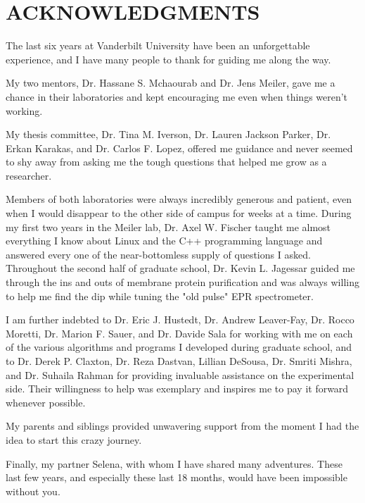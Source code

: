 
\chapter*{ACKNOWLEDGMENTS}
\vspace{7mm}

The last six years at Vanderbilt University have been an unforgettable experience, and I have many people to thank for guiding me along the way.

My two mentors, Dr. Hassane S. Mchaourab and Dr. Jens Meiler, gave me a chance in their laboratories and kept encouraging me even when things weren't working.

My thesis committee, Dr. Tina M. Iverson, Dr. Lauren Jackson Parker, Dr. Erkan Karakas, and Dr. Carlos F. Lopez, offered me guidance and never seemed to shy away from asking me the tough questions that helped me grow as a researcher.

Members of both laboratories were always incredibly generous and patient, even when I would disappear to the other side of campus for weeks at a time. During my first two years in the Meiler lab, Dr. Axel W. Fischer taught me almost everything I know about Linux and the C++ programming language and answered every one of the near-bottomless supply of questions I asked. Throughout the second half of graduate school, Dr. Kevin L. Jagessar guided me through the ins and outs of membrane protein purification and was always willing to help me find the dip while tuning the "old pulse" EPR spectrometer.

I am further indebted to Dr. Eric J. Hustedt, Dr. Andrew Leaver-Fay,  Dr. Rocco Moretti, Dr. Marion F. Sauer, and Dr. Davide Sala for working with me on each of the various algorithms and programs I developed during graduate school, and to Dr. Derek P. Claxton, Dr. Reza Dastvan, Lillian DeSousa, Dr. Smriti Mishra, and Dr. Suhaila Rahman for providing invaluable assistance on the experimental side. Their willingness to help was exemplary and inspires me to pay it forward whenever possible.

My parents and siblings provided unwavering support from the moment I had the idea to start this crazy journey. 

Finally, my partner Selena, with whom I have shared many adventures. These last few years, and especially these last 18 months, would have been impossible without you.